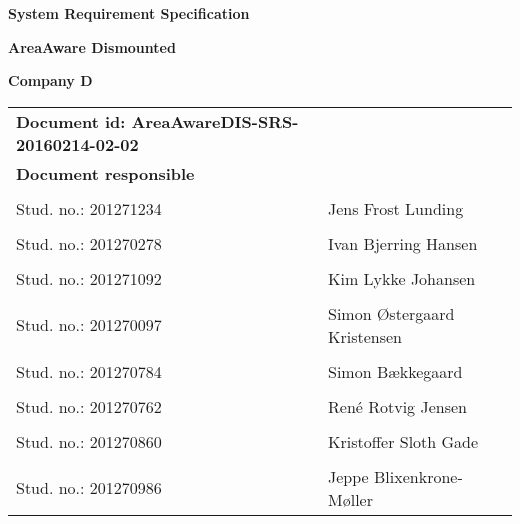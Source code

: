
\centerline{\Huge\bfseries\color{ThemeColor} System Requirement Specification } 

\vspace{1em}
\centerline{\Large\bfseries\color{BlackColor} AreaAware Dismounted} 

\vspace{5em}
\centerline{\large\bfseries\color{BlackColor}Company D} 




\begin{center}
	\begin{tabular}{ l l l}
		\textbf{Document id: AreaAwareDIS-SRS-20160214-02-02}& & \\
		\textbf{Document responsible}& & \\
		& & \\
		Stud. no.:  201271234 & Jens Frost Lunding & \\\hline
		& & \\
		Stud. no.:  201270278 & Ivan Bjerring Hansen & \\\hline
		& & \\
		Stud. no.:  201271092 & Kim Lykke Johansen & \\\hline
		& & \\	
		Stud. no.:  201270097 & Simon Østergaard Kristensen & \\\hline
		& & \\
		Stud. no.:  201270784 & Simon Bækkegaard & \\\hline
		& & \\
		Stud. no.: 	201270762 & René Rotvig Jensen & \\\hline
		& & \\
		Stud. no.: 	201270860 & Kristoffer Sloth Gade & \\\hline
		& & \\
		Stud. no.: 	201270986 & Jeppe Blixenkrone-Møller & \\\hline
	\end{tabular}     	
\end{center}
\thispagestyle{empty} %
\restoregeometry



		